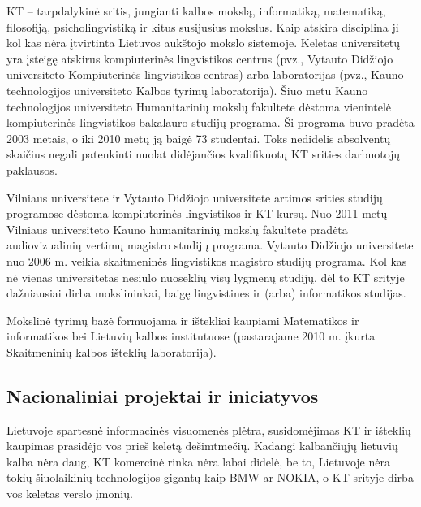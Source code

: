 \documentclass[]{../metanetpaper}
\begin{document}
\begin{multicols}{2}
KT – tarpdalykinė sritis, jungianti kalbos mokslą, informatiką, matematiką, filosofiją, psicholingvistiką ir kitus susijusius mokslus. Kaip atskira disciplina ji kol kas nėra įtvirtinta Lietuvos aukštojo mokslo sistemoje. Keletas universitetų yra įsteigę atskirus kompiuterinės lingvistikos centrus (pvz., Vytauto Didžiojo universiteto Kompiuterinės lingvistikos centras) arba laboratorijas (pvz., Kauno technologijos universiteto Kalbos tyrimų laboratorija). Šiuo metu Kauno technologijos universiteto Humanitarinių mokslų fakultete dėstoma vienintelė kompiuterinės lingvistikos bakalauro studijų programa. Ši programa buvo pradėta 2003 metais, o iki 2010 metų ją baigė 73 studentai. Toks nedidelis absolventų skaičius negali patenkinti nuolat didėjančios kvalifikuotų KT srities darbuotojų paklausos.  

    Vilniaus universitete ir Vytauto Didžiojo universitete artimos srities studijų programose dėstoma kompiuterinės lingvistikos ir KT kursų. Nuo 2011 metų Vilniaus universiteto Kauno humanitarinių mokslų fakultete pradėta audiovizualinių vertimų magistro studijų programa. Vytauto Didžiojo universitete nuo 2006 m. veikia skaitmeninės lingvistikos magistro studijų programa. Kol kas nė vienas universitetas nesiūlo nuoseklių visų lygmenų studijų, dėl to KT srityje dažniausiai dirba mokslininkai, baigę lingvistines ir (arba) informatikos studijas. 

Mokslinė tyrimų bazė formuojama ir ištekliai kaupiami Matematikos ir informatikos bei Lietuvių kalbos institutuose (pastarajame 2010 m. įkurta Skaitmeninių kalbos išteklių laboratorija).

\subsection{Nacionaliniai projektai ir iniciatyvos}

 Lietuvoje spartesnė informacinės visuomenės plėtra, susidomėjimas KT ir išteklių kaupimas prasidėjo vos prieš keletą dešimtmečių. Kadangi kalbančiųjų lietuvių kalba nėra daug, KT komercinė rinka nėra labai didelė, be to, Lietuvoje nėra tokių šiuolaikinių technologijos gigantų kaip BMW ar NOKIA, o KT srityje dirba vos keletas verslo įmonių.  


\end{multicols}
\end{document}
